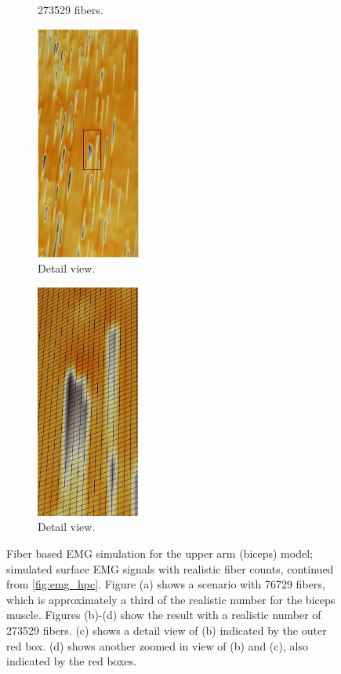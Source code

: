 \begin{figure}
\begin{subfigure}{0.30\textwidth}
    \caption{\num{273529} fibers.}%
    \label{fig:emg273529b}%
  \end{subfigure}\hspace{-1cm}
  \begin{minipage}{0.5\textwidth}
    \vspace{48mm}
    \begin{subfigure}[t]{0.5\textwidth}%
      \centering%
      \includegraphics[height=77mm]{images/results/application/emg523-1.pdf}%
      \caption{Detail view.}%
      \label{fig:emg273529c}%
    \end{subfigure}\hspace{-5mm}
    \begin{subfigure}[t]{0.49\textwidth}%
      \centering%
      \includegraphics[height=77mm]{images/results/application/emg523-2.png}%
      \caption{Detail view.}%
      \label{fig:emg273529d}%
    \end{subfigure}
  \end{minipage}
  \caption{Fiber based EMG simulation for the upper arm (biceps) model; simulated surface EMG signals with realistic fiber counts, continued from \cref{fig:emg_hpc}. Figure (a) shows a scenario with \num{76729} fibers, which is approximately a third of the realistic number for the biceps muscle. Figures (b)-(d) show the result with a realistic number of \num{273529} fibers. (c) shows a detail view of (b) indicated by the outer red box. (d) shows another zoomed in view of (b) and (c), also indicated by the red boxes.}%
  \label{fig:emg_hpc2}%
\end{figure}%

